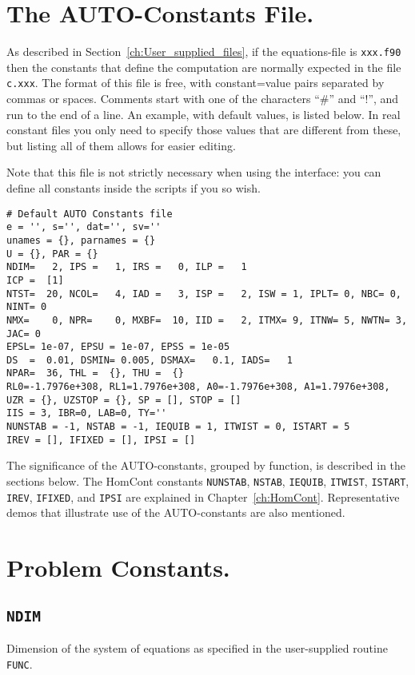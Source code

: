 \documentclass[12pt]{report}
\begin{document}
\section{ The {\cal AUTO}-Constants File.} \label{sec:The_AUTO_constants_file}
As described in Section~\ref{ch:User_supplied_files}, 
if the equations-file is {\tt xxx.f90} 
then the constants that define the computation 
are normally expected in the file  {\tt c.xxx}.
The format of this file is free, with constant=value pairs separated
by commas or spaces. Comments start with one of the characters  ``\#''
and ``!'', and run to the end of a line.
An example, with default values, is listed below. In real constant
files you only need to specify those values that are different from
these, but listing all of them allows for easier editing.

Note that this file is not strictly necessary when using the \python
interface: you can define all constants inside the scripts if you so wish.

\begin{verbatim}
# Default AUTO Constants file
e = '', s='', dat='', sv=''
unames = {}, parnames = {}
U = {}, PAR = {}
NDIM=   2, IPS =   1, IRS =   0, ILP =   1
ICP =  [1]
NTST=  20, NCOL=   4, IAD =   3, ISP =   2, ISW = 1, IPLT= 0, NBC= 0, NINT= 0
NMX=    0, NPR=    0, MXBF=  10, IID =   2, ITMX= 9, ITNW= 5, NWTN= 3, JAC= 0
EPSL= 1e-07, EPSU = 1e-07, EPSS = 1e-05
DS  =  0.01, DSMIN= 0.005, DSMAX=   0.1, IADS=   1
NPAR=  36, THL =  {}, THU =  {}
RL0=-1.7976e+308, RL1=1.7976e+308, A0=-1.7976e+308, A1=1.7976e+308,
UZR = {}, UZSTOP = {}, SP = [], STOP = []
IIS = 3, IBR=0, LAB=0, TY=''
NUNSTAB = -1, NSTAB = -1, IEQUIB = 1, ITWIST = 0, ISTART = 5
IREV = [], IFIXED = [], IPSI = []
\end{verbatim}

The significance of the {\cal AUTO}-constants, grouped by function, is 
described in the sections below. The HomCont constants \texttt{NUNSTAB},
\texttt{NSTAB}, \texttt{IEQUIB}, \texttt{ITWIST}, \texttt{ISTART},
\texttt{IREV}, \texttt{IFIXED}, and \texttt{IPSI} are explained in
Chapter~\ref{ch:HomCont}.
Representative demos that illustrate use of the {\cal AUTO}-constants
are also mentioned.

\section{ Problem Constants.} \label{sec:Problem_constants}
\subsection{\texttt{NDIM}} \label{sec:NDIM}
 Dimension of the system of equations as specified in the user-supplied
 routine {\tt FUNC}.
\end{document}
